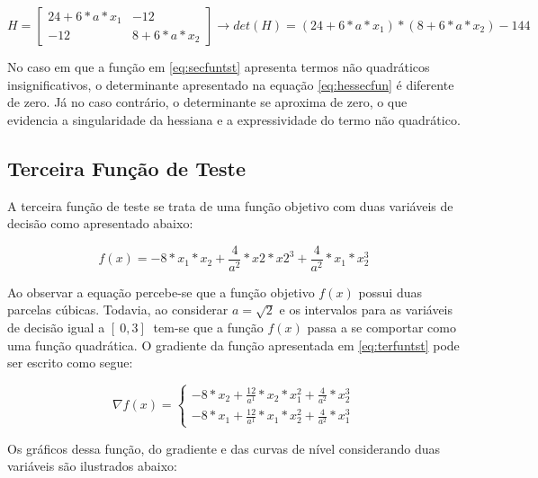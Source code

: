 \begin{equation}\label{eq:hessecfun}
    H = \begin{bmatrix}
                    24+6*a*x_1 & -12 \\
                    -12 & 8+6*a*x_2
                \end{bmatrix} \rightarrow det(H) = (24+6*a*x_1)*(8+6*a*x_2)-144   
\end{equation}

No caso em que a função em \ref{eq:secfuntst}  apresenta termos não quadráticos insignificativos, o determinante apresentado na equação \ref{eq:hessecfun} é diferente de zero. Já no caso contrário, o determinante se aproxima de zero, o que evidencia a singularidade da hessiana e a expressividade do termo não quadrático.

\subsection{Terceira Função de Teste}\label{sec:terfun}

A terceira função de teste se trata de uma função objetivo com duas variáveis de decisão como apresentado abaixo:

\begin{equation}\label{eq:terfuntst}
    f(x)=-8*x_1*x_2+\frac{4}{a^2}*x2*x2^3+\frac{4}{a^2}*x_1*x_2^3
\end{equation}

Ao observar a equação \label{eq:terfuntst} percebe-se que a função objetivo $f(x)$ possui duas parcelas cúbicas. Todavia, ao considerar $a=\sqrt{2}$ e os intervalos para as variáveis de decisão igual a $[\ 0 , 3 ]\ $ tem-se  que a função $f(x)$ passa a se comportar como uma função quadrática. O gradiente da função apresentada em \ref{eq:terfuntst} pode ser escrito como segue:

\begin{equation}\label{eq:gradterfuntst}
    \nabla f(x) = \begin{cases}
         -8*x_2+\frac{12}{a^1}*x_2*x_1^2+\frac{4}{a^2}*x_2^3\\
         -8*x_1+\frac{12}{a^1}*x_1*x_2^2+\frac{4}{a^2}*x_1^3
    \end{cases}
\end{equation} 
   	   
Os gráficos dessa função, do gradiente e das curvas de nível considerando duas variáveis são ilustrados abaixo:

